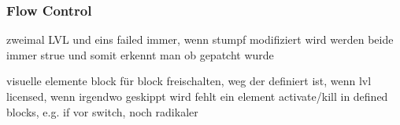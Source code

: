\subsubsection{Flow Control} \label{subsection:counter-improve-tampering-flow}


zweimal LVL und eins failed immer, wenn stumpf modifiziert wird werden beide immer strue und somit erkennt man ob gepatcht wurde

visuelle elemente block für block freischalten, weg der definiert ist, wenn lvl licensed, wenn irgendwo geskippt wird fehlt ein element
activate/kill in defined blocks, e.g. if vor switch, noch radikaler
